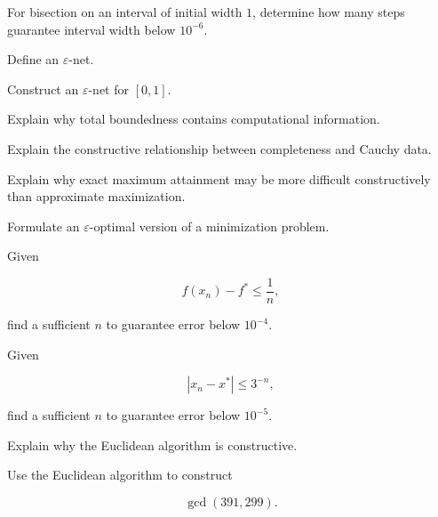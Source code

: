 \begin{exercise}[3]
For bisection on an interval of initial width \(1\), determine how many
steps guarantee interval width below \(10^{-6}\).
\end{exercise}

\begin{exercise}[2]
Define an \(\varepsilon\)-net.
\end{exercise}

\begin{exercise}[3]
Construct an \(\varepsilon\)-net for \([0,1]\).
\end{exercise}

\begin{exercise}[3]
Explain why total boundedness contains computational information.
\end{exercise}

\begin{exercise}[3]
Explain the constructive relationship between completeness and Cauchy data.
\end{exercise}

\begin{exercise}[3]
Explain why exact maximum attainment may be more difficult constructively
than approximate maximization.
\end{exercise}

\begin{exercise}[3]
Formulate an \(\varepsilon\)-optimal version of a minimization problem.
\end{exercise}

\begin{exercise}[3]
Given

\[
f(x_n)-f^*
\leq
\frac1n,
\]

find a sufficient \(n\) to guarantee error below \(10^{-4}\).
\end{exercise}

\begin{exercise}[3]
Given

\[
|x_n-x^*|
\leq
3^{-n},
\]

find a sufficient \(n\) to guarantee error below \(10^{-5}\).
\end{exercise}

\begin{exercise}[2]
Explain why the Euclidean algorithm is constructive.
\end{exercise}

\begin{exercise}[2]
Use the Euclidean algorithm to construct

\[
\gcd(391,299).
\]
\end{exercise}

